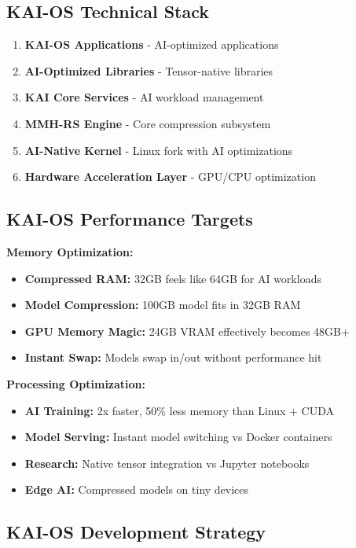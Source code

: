 \documentclass[12pt,a4paper]{article}
\begin{document}
\subsection{KAI-OS Technical Stack}

\begin{enumerate}
    \item \textbf{KAI-OS Applications} - AI-optimized applications
    \item \textbf{AI-Optimized Libraries} - Tensor-native libraries
    \item \textbf{KAI Core Services} - AI workload management
    \item \textbf{MMH-RS Engine} - Core compression subsystem
    \item \textbf{AI-Native Kernel} - Linux fork with AI optimizations
    \item \textbf{Hardware Acceleration Layer} - GPU/CPU optimization
\end{enumerate}

\subsection{KAI-OS Performance Targets}

\textbf{Memory Optimization:}
\begin{itemize}
    \item \textbf{Compressed RAM:} 32GB feels like 64GB for AI workloads
    \item \textbf{Model Compression:} 100GB model fits in 32GB RAM
    \item \textbf{GPU Memory Magic:} 24GB VRAM effectively becomes 48GB+
    \item \textbf{Instant Swap:} Models swap in/out without performance hit
\end{itemize}

\textbf{Processing Optimization:}
\begin{itemize}
    \item \textbf{AI Training:} 2x faster, 50\% less memory than Linux + CUDA
    \item \textbf{Model Serving:} Instant model switching vs Docker containers
    \item \textbf{Research:} Native tensor integration vs Jupyter notebooks
    \item \textbf{Edge AI:} Compressed models on tiny devices
\end{itemize}

\subsection{KAI-OS Development Strategy}
\end{document}
